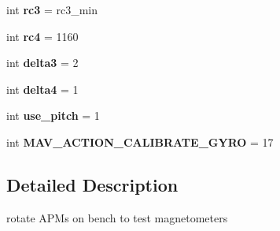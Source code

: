 \begin{DoxyCompactItemize}
int {\bfseries rc3} = rc3\+\_\+min
\item 
\mbox{\label{namespacepymavlink_1_1examples_1_1magtest_aa9bde9712f6ffdff13b645156c09dfab}} 
int {\bfseries rc4} = 1160
\item 
\mbox{\label{namespacepymavlink_1_1examples_1_1magtest_a37cbe5d4fa2ee121f942f429b5410480}} 
int {\bfseries delta3} = 2
\item 
\mbox{\label{namespacepymavlink_1_1examples_1_1magtest_aa4df78ddff63972a042d7aa5c592c55e}} 
int {\bfseries delta4} = 1
\item 
\mbox{\label{namespacepymavlink_1_1examples_1_1magtest_abb93a4c501f31a01d184d4e3f3d69ca1}} 
int {\bfseries use\+\_\+pitch} = 1
\item 
\mbox{\label{namespacepymavlink_1_1examples_1_1magtest_a8b7b677aa683b3117014b1b8c4c6587a}} 
int {\bfseries M\+A\+V\+\_\+\+A\+C\+T\+I\+O\+N\+\_\+\+C\+A\+L\+I\+B\+R\+A\+T\+E\+\_\+\+G\+Y\+RO} = 17
\end{DoxyCompactItemize}


\subsection{Detailed Description}
\begin{DoxyVerb}rotate APMs on bench to test magnetometers\end{DoxyVerb}
 